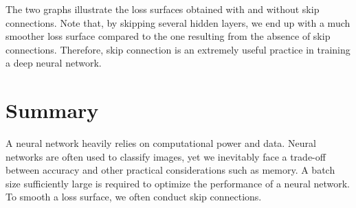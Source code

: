 The two graphs illustrate the loss surfaces obtained with and without skip connections. Note that, by skipping several hidden layers, we end up with a much smoother loss surface compared to the one resulting from the absence of skip connections. Therefore, skip connection is an extremely useful practice in training a deep neural network.
\clearpage

\section{Summary}
A neural network heavily relies on computational power and data. Neural networks are often used to classify images, yet we inevitably face a trade-off between accuracy and other practical considerations such as memory. A batch size sufficiently large is required to optimize the performance of a neural network. To smooth a loss surface, we often conduct skip connections.